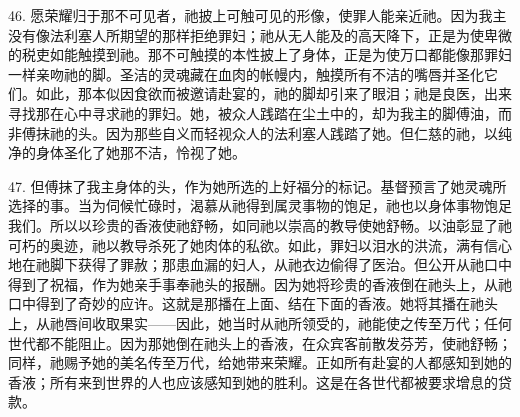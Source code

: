 46. 愿荣耀归于那不可见者，祂披上可触可见的形像，使罪人能亲近祂。因为我主没有像法利塞人所期望的那样拒绝罪妇；祂从无人能及的高天降下，正是为使卑微的税吏如能触摸到祂。那不可触摸的本性披上了身体，正是为使万口都能像那罪妇一样亲吻祂的脚。圣洁的灵魂藏在血肉的帐幔内，触摸所有不洁的嘴唇并圣化它们。如此，那本似因食欲而被邀请赴宴的，祂的脚却引来了眼泪；祂是良医，出来寻找那在心中寻求祂的罪妇。她，被众人践踏在尘土中的，却为我主的脚傅油，而非傅抹祂的头。因为那些自义而轻视众人的法利塞人践踏了她。但仁慈的祂，以纯净的身体圣化了她那不洁，怜视了她。\par

47. 但傅抹了我主身体的头，作为她所选的上好福分的标记。基督预言了她灵魂所选择的事。当为伺候忙碌时，渴慕从祂得到属灵事物的饱足，祂也以身体事物饱足我们。所以以珍贵的香液使祂舒畅，如同祂以崇高的教导使她舒畅。以油彰显了祂可朽的奥迹，祂以教导杀死了她肉体的私欲。如此，罪妇以泪水的洪流，满有信心地在祂脚下获得了罪赦；那患血漏的妇人，从祂衣边偷得了医治。但公开从祂口中得到了祝福，作为她亲手事奉祂头的报酬。因为她将珍贵的香液倒在祂头上，从祂口中得到了奇妙的应许。这就是那播在上面、结在下面的香液。她将其播在祂头上，从祂唇间收取果实——因此，她当时从祂所领受的，祂能使之传至万代；任何世代都不能阻止。因为那她倒在祂头上的香液，在众宾客前散发芬芳，使祂舒畅；同样，祂赐予她的美名传至万代，给她带来荣耀。正如所有赴宴的人都感知到她的香液；所有来到世界的人也应该感知到她的胜利。这是在各世代都被要求增息的贷款。\par

